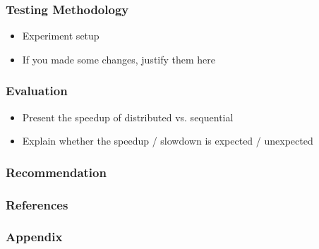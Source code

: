 \documentclass[11pt,t,usepdftitle=false,aspectratio=169]{beamer}
\begin{document}
\begin{frame}
\frametitle{Testing Methodology}
    \begin{itemize}
        \item Experiment setup
        \item If you made some changes, justify them here
    \end{itemize}
\end{frame}

\begin{frame}
\frametitle{Evaluation}
    \begin{itemize}
        \item Present the speedup of distributed vs. sequential
        \item Explain whether the speedup / slowdown is expected / unexpected
    \end{itemize}
\end{frame}

\begin{frame}
\frametitle{Recommendation}
\end{frame}




\begingroup

{\footnotesize
\begin{frame}
  \frametitle{References}
  \begin{minipage}[t]{1\textwidth}
    \vspace{1cm}
  \end{minipage}
\end{frame}
}

\begin{frame}
    \frametitle{Appendix}

\end{frame}
\endgroup
\end{document}
